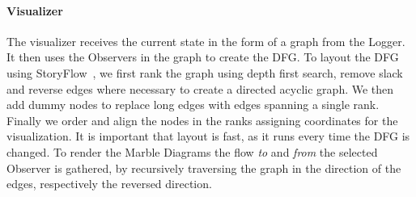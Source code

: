 \paragraph{Visualizer} The visualizer receives the current state in the
form of a graph from the Logger.  It then uses the Observers in the
graph to create the DFG.  To layout the DFG using StoryFlow~\cite{liu2013storyflow},
we first rank the graph using depth first search, remove slack and
reverse edges where necessary to create a directed acyclic graph.  We
then add dummy nodes to replace long edges with edges spanning a single
rank.  Finally we order and align the nodes in the ranks assigning
coordinates for the visualization.  It is important that layout is fast,
as it runs every time the DFG is changed.  To render the Marble Diagrams
the flow \emph{to} and \emph{from} the selected Observer is gathered, by recursively
traversing the graph in the direction of the edges, respectively the
reversed direction.
